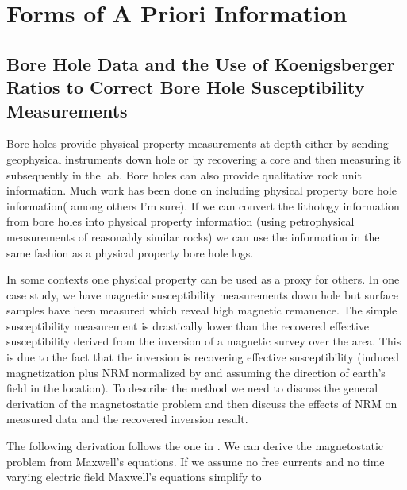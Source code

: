 \section{Forms of A Priori Information}
\label{sec:Forms of A Priori Information}

\subsection{Bore Hole Data and the Use of Koenigsberger Ratios to Correct Bore Hole Susceptibility Measurements}
\label{sec: Bore Hole Data}

Bore holes provide physical property measurements at depth either by sending geophysical instruments down hole or by recovering a core and then measuring it subsequently in the lab. Bore holes can also provide qualitative rock unit information. Much work has been done on including physical property bore hole information(\cite{williams2008geologically} among others I'm sure). If we can convert the lithology information from bore holes into physical property information (using petrophysical measurements of reasonably similar rocks) we can use the information in the same fashion as a physical property bore hole logs.

In some contexts one physical property can be used as a proxy for others. In one case study, we have magnetic susceptibility measurements down hole but surface samples have been measured which reveal high magnetic remanence. The simple susceptibility measurement is drastically lower than the recovered effective susceptibility derived from the inversion of a magnetic survey over the area. This is due to the fact that the inversion is recovering effective susceptibility (induced magnetization plus \ac{NRM} normalized by and assuming the direction of earth's field in the location). To describe the method we need to discuss the general derivation of the magnetostatic problem and then discuss the effects of \ac{NRM} on measured data and the recovered inversion result. 

The following derivation follows the one in \cite{fournier2015cooperative}. We can derive the magnetostatic problem from Maxwell's equations. If we assume no free currents and no time varying electric field Maxwell's equations simplify to 

